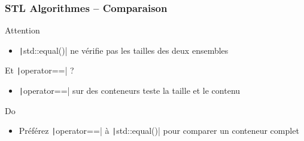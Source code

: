 \documentclass[C++.tex]{subfiles}
\begin{document}
\begin{frame}[fragile]
	\frametitle{STL Algorithmes -- Comparaison}
	\begin{alertblock}{Attention}
		\begin{itemize}
			\item \texttt|std::equal()| ne vérifie pas les tailles des deux ensembles
		\end{itemize}
	\end{alertblock}

	\begin{block}{Et \texttt|operator==| ?}
		\begin{itemize}
			\item \texttt|operator==| sur des conteneurs teste la taille et le contenu
		\end{itemize}
	\end{block}

	\begin{exampleblock}{Do}
		\begin{itemize}
			\item Préférez \texttt|operator==| à \texttt|std::equal()| pour comparer un conteneur complet
		\end{itemize}
	\end{exampleblock}
\end{frame}
\end{document}
